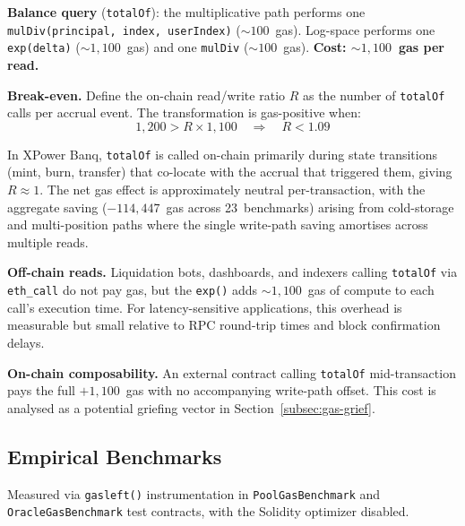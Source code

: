 \documentclass[10pt,a4paper,twocolumn]{article}
\theoremstyle{definition}
\theoremstyle{plain}
\theoremstyle{remark}
\begin{document}
\textbf{Balance query} (\texttt{totalOf}): the multiplicative path performs one \texttt{mulDiv(principal, index, userIndex)} (${\sim}100$~gas). Log-space performs one \texttt{exp(delta)} (${\sim}1{,}100$~gas) and one \texttt{mulDiv} (${\sim}100$~gas). \textbf{Cost: ${\sim}1{,}100$~gas per read.}

\textbf{Break-even.} Define the on-chain read/write ratio $R$ as the number of \texttt{totalOf} calls per accrual event. The transformation is gas-positive when:
\begin{equation}
\label{eq:breakeven}
1{,}200 > R \times 1{,}100 \quad \Longrightarrow \quad R < 1.09
\end{equation}

In XPower Banq, \texttt{totalOf} is called on-chain primarily during state transitions (mint, burn, transfer) that co-locate with the accrual that triggered them, giving $R \approx 1$. The net gas effect is approximately neutral per-transaction, with the aggregate saving ($-114{,}447$~gas across 23~benchmarks) arising from cold-storage and multi-position paths where the single write-path saving amortises across multiple reads.

\textbf{Off-chain reads.} Liquidation bots, dashboards, and indexers calling \texttt{totalOf} via \texttt{eth\_call} do not pay gas, but the \texttt{exp()} adds ${\sim}1{,}100$~gas of compute to each call's execution time. For latency-sensitive applications, this overhead is measurable but small relative to RPC round-trip times and block confirmation delays.

\textbf{On-chain composability.} An external contract calling \texttt{totalOf} mid-transaction pays the full $+1{,}100$~gas with no accompanying write-path offset. This cost is analysed as a potential griefing vector in Section~\ref{subsec:gas-grief}.

\subsection{Empirical Benchmarks}
\label{subsec:gas-bench}

Measured via \texttt{gasleft()} instrumentation in \texttt{PoolGasBenchmark} and \texttt{OracleGasBenchmark} test contracts, with the Solidity optimizer disabled.
\end{document}
